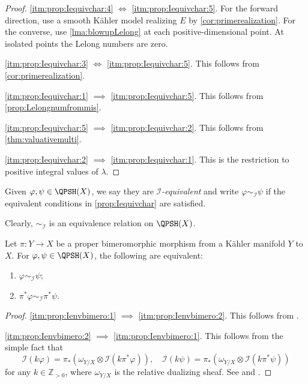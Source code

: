 \begin{proof}
    \ref{itm:prop:Iequivchar:4} $\iff$ \ref{itm:prop:Iequivchar:5}. For the forward direction, use a smooth Kähler model realizing $E$ by \cref{cor:primerealization}. For the converse, use \cref{lma:blowupLelong} at each positive-dimensional point. At isolated points the Lelong numbers are zero.

    \ref{itm:prop:Iequivchar:3} $\iff$ \ref{itm:prop:Iequivchar:5}. This follows from \cref{cor:primerealization}.

    \ref{itm:prop:Iequivchar:1} $\implies$ \ref{itm:prop:Iequivchar:5}. This follows from \cref{prop:Lelongnumfrommis}.

    \ref{itm:prop:Iequivchar:5} $\implies$ \ref{itm:prop:Iequivchar:2}. This follows from \cref{thm:valuativemulti}.

    \ref{itm:prop:Iequivchar:2} $\implies$ \ref{itm:prop:Iequivchar:1}. This is the restriction to positive integral values of $\lambda$.
\end{proof}


\begin{definition}\label{def:Iequiv}
    Given $\varphi,\psi\in \QPSH(X)$, we say they are \emph{$\mathcal{I}$-equivalent} and write $\varphi\sim_{\mathcal{I}}\psi$ if the equivalent conditions in \cref{prop:Iequivchar} are satisfied.
\end{definition}
Clearly, $\sim_{\mathcal{I}}$ is an equivalence relation on $\QPSH(X)$.

\begin{proposition}\label{prop:Ienvbimero}
    Let $\pi\colon Y\rightarrow X$ be a proper bimeromorphic morphism from a Kähler manifold $Y$ to $X$. For $\varphi,\psi\in \QPSH(X)$, the following are equivalent:
    \begin{enumerate}
        \item\label{itm:prop:Ienvbimero:1} $\varphi\sim_{\mathcal{I}}\psi$;
        \item\label{itm:prop:Ienvbimero:2} $\pi^*\varphi\sim_{\mathcal{I}}\pi^*\psi$.
    \end{enumerate}
\end{proposition}
\begin{proof}
    \ref{itm:prop:Ienvbimero:1} $\implies$ \ref{itm:prop:Ienvbimero:2}. This follows from .

    \ref{itm:prop:Ienvbimero:2} $\implies$ \ref{itm:prop:Ienvbimero:1}. This follows from the simple fact that
    \[
        \mathcal{I}(k\varphi)=\pi_* \left( \omega_{Y/X}\otimes \mathcal{I}(k\pi^*\varphi)  \right),\quad \mathcal{I}(k\psi)=\pi_* \left( \omega_{Y/X}\otimes \mathcal{I}(k\pi^*\psi)  \right)
    \]
    for any $k\in \mathbb{Z}_{>0}$, where $\omega_{Y/X}$ is the relative dualizing sheaf. See \cite[Proposition~5.8]{Dem12} and \cite[Proposition~12.6.4]{FPT}.
\end{proof}


